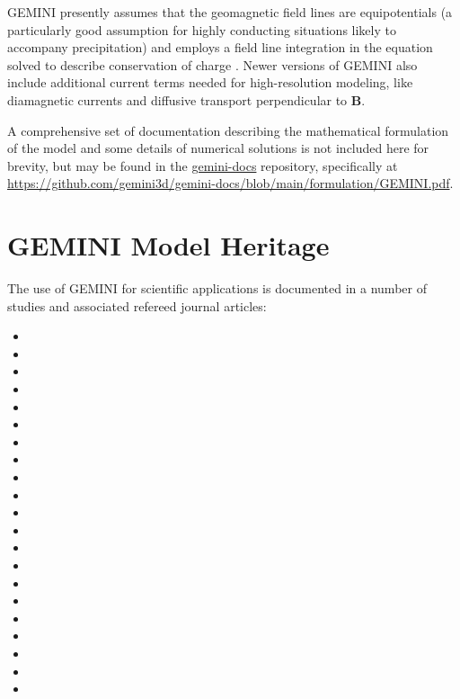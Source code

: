 \documentclass[11pt,letterpaper]{article}
\begin{document}
GEMINI presently assumes that the geomagnetic field lines are equipotentials (a particularly good assumption for highly conducting situations likely to accompany precipitation) and employs a field line integration in the equation solved to describe conservation of charge \citep[cf.][Equation 1]{Zettergren:2015}.  Newer versions of GEMINI also include additional current terms needed for high-resolution modeling, like diamagnetic currents and diffusive transport perpendicular to $\mathbf{B}$. 

A comprehensive set of documentation describing the mathematical formulation of the model and some details of numerical solutions is not included here for brevity, but may be found in the \href{https://github.com/gemini3d/gemini-docs}{gemini-docs} repository, specifically at \url{https://github.com/gemini3d/gemini-docs/blob/main/formulation/GEMINI.pdf}.  

\section{GEMINI Model Heritage}

The use of GEMINI for scientific applications is documented in a number of studies and associated refereed journal articles:  
\begin{itemize}
  \item {}
  \item {}
  \item {}
  \item {}
  \item {}
  \item {}
  \item {}
  \item {}
  \item {}
  \item {}
  \item {}
  \item {}  
  \item {}  
  \item {}  
  \item {} 
  \item {}   
  \item {} 
  \item {} 
  \item {} 
  \item {} 
  \item {}  
\end{itemize}
\end{document}
